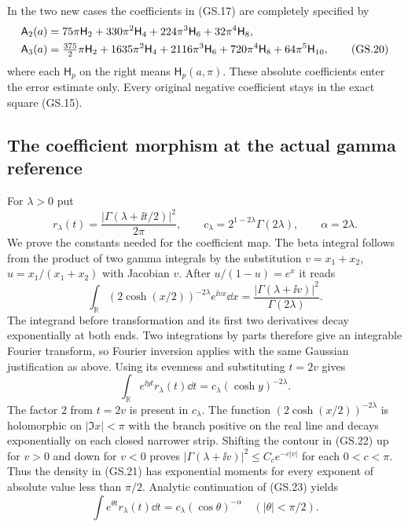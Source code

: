 In the two new cases the coefficients in (GS.17) are completely
specified by
\begin{align}
 \mathsf A_2(a)
 &=75\pi\mathsf H_2+330\pi^2\mathsf H_4
   +224\pi^3\mathsf H_6+32\pi^4\mathsf H_8,\notag\\
 \mathsf A_3(a)
 &=\tfrac{375}{2}\pi\mathsf H_2+1635\pi^2\mathsf H_4
   +2116\pi^3\mathsf H_6+720\pi^4\mathsf H_8
   +64\pi^5\mathsf H_{10},\tag{GS.20}
\end{align}
where each $\mathsf H_p$ on the right means $\mathsf H_p(a,\pi)$.
These absolute coefficients enter the error estimate only. Every
original negative coefficient stays in the exact square (GS.15).

\subsection{The coefficient morphism at the actual gamma reference}

For $\lambda>0$ put
\begin{equation}
 r_\lambda(t)=\frac{|\Gamma(\lambda+\ii t/2)|^2}{2\pi},\qquad
 c_\lambda=2^{1-2\lambda}\Gamma(2\lambda),\qquad
 \alpha=2\lambda.\tag{GS.21}
\end{equation}
We prove the constants needed for the coefficient map. The beta
integral follows from the product of two gamma integrals by the
substitution $v=x_1+x_2$, $u=x_1/(x_1+x_2)$ with Jacobian $v$.
After $u/(1-u)=e^x$ it reads
\begin{equation}
 \int_{\mathbb R}(2\cosh(x/2))^{-2\lambda}e^{\ii vx}\dd x
 =\frac{|\Gamma(\lambda+\ii v)|^2}{\Gamma(2\lambda)}.
 \tag{GS.22}
\end{equation}
The integrand before transformation and its first two derivatives
decay exponentially at both ends. Two integrations by parts therefore
give an integrable Fourier transform, so Fourier inversion applies
with the same Gaussian justification as above. Using its evenness
and substituting $t=2v$ gives
\begin{equation}
 \int_{\mathbb R}e^{\ii yt}r_\lambda(t)\dd t
 =c_\lambda(\cosh y)^{-2\lambda}.\tag{GS.23}
\end{equation}
The factor $2$ from $t=2v$ is present in $c_\lambda$.
The function $(2\cosh(x/2))^{-2\lambda}$ is holomorphic on
$|\Im x|<\pi$ with the branch positive on the real line and
decays exponentially on each closed narrower strip. Shifting the
contour in (GS.22) up for $v>0$ and down for $v<0$ proves
$|\Gamma(\lambda+\ii v)|^2\le C_c e^{-c|v|}$ for each
$0<c<\pi$. Thus the density in (GS.21) has exponential moments
for every exponent of absolute value less than $\pi/2$.
Analytic continuation of (GS.23) yields
\begin{equation}
 \int e^{\theta t}r_\lambda(t)\dd t
 =c_\lambda(\cos\theta)^{-\alpha}\quad(|\theta|<\pi/2).
 \tag{GS.24}
\end{equation}

